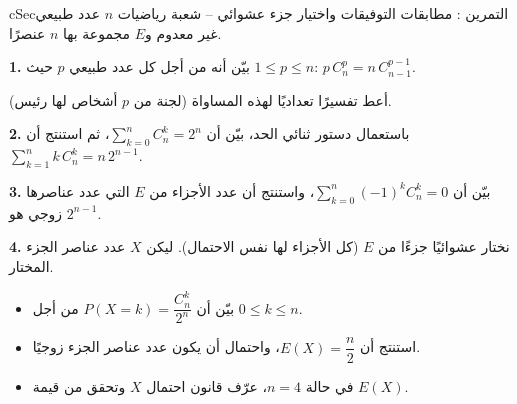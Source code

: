 \documentclass[12pt,a4paper]{article}
\newenvironment{BOX}[2]{\begin{otherlanguage}{english}\begin{arbox}{#1}{#2}}{\end{arbox}\end{otherlanguage}}
\newcounter{exo}
\newenvironment{tamrin}[1]{\stepcounter{exo}\begin{BOX}{cSec}{التمرين \theexo: #1}}{\end{BOX}}
\newenvironment{sq}{\begin{itemize}[leftmargin=2.4em,itemsep=3pt]}{\end{itemize}}
\newcommand{\qa}{\item[(أ)]}\newcommand{\qb}{\item[(ب)]}\newcommand{\qc}{\item[(جـ)]}\newcommand{\qd}{\item[(د)]}\newcommand{\qe}{\item[(هـ)]}
\newcommand{\QQ}[1]{\par\smallskip\textbf{#1.} }
\begin{document}
\begin{tamrin}{مطابقات التوفيقات واختيار جزء عشوائي -- شعبة رياضيات}
$n$ عدد طبيعي غير معدوم و$E$ مجموعة بها $n$ عنصرًا.
\QQ{1} بيّن أنه من أجل كل عدد طبيعي $p$ حيث $1\leqslant p\leqslant n$: \quad $p\,C_n^p=n\,C_{n-1}^{p-1}$.\par
أعط تفسيرًا تعداديًا لهذه المساواة (لجنة من $p$ أشخاص لها رئيس).
\QQ{2} باستعمال دستور ثنائي الحد، بيّن أن $\displaystyle\sum_{k=0}^{n}C_n^k=2^n$، ثم استنتج أن $\displaystyle\sum_{k=1}^{n}k\,C_n^k=n\,2^{n-1}$.
\QQ{3} بيّن أن $\displaystyle\sum_{k=0}^{n}(-1)^kC_n^k=0$، واستنتج أن عدد الأجزاء من $E$ التي عدد عناصرها زوجي هو $2^{n-1}$.
\QQ{4} نختار عشوائيًا جزءًا من $E$ (كل الأجزاء لها نفس الاحتمال). ليكن $X$ عدد عناصر الجزء المختار.
\begin{sq}
\qa بيّن أن $P(X=k)=\dfrac{C_n^k}{2^n}$ من أجل $0\leqslant k\leqslant n$.
\qb استنتج أن $E(X)=\dfrac n2$، واحتمال أن يكون عدد عناصر الجزء زوجيًا.
\qc في حالة $n=4$، عرّف قانون احتمال $X$ وتحقق من قيمة $E(X)$.
\end{sq}
\end{tamrin}
\end{document}
